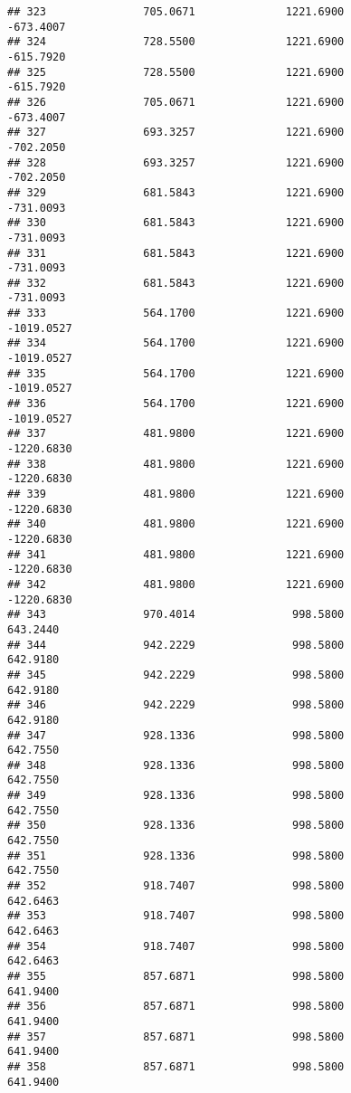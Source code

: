\documentclass[]{article}
\begin{document}
\begin{verbatim}
## 323               705.0671              1221.6900           -673.4007
## 324               728.5500              1221.6900           -615.7920
## 325               728.5500              1221.6900           -615.7920
## 326               705.0671              1221.6900           -673.4007
## 327               693.3257              1221.6900           -702.2050
## 328               693.3257              1221.6900           -702.2050
## 329               681.5843              1221.6900           -731.0093
## 330               681.5843              1221.6900           -731.0093
## 331               681.5843              1221.6900           -731.0093
## 332               681.5843              1221.6900           -731.0093
## 333               564.1700              1221.6900          -1019.0527
## 334               564.1700              1221.6900          -1019.0527
## 335               564.1700              1221.6900          -1019.0527
## 336               564.1700              1221.6900          -1019.0527
## 337               481.9800              1221.6900          -1220.6830
## 338               481.9800              1221.6900          -1220.6830
## 339               481.9800              1221.6900          -1220.6830
## 340               481.9800              1221.6900          -1220.6830
## 341               481.9800              1221.6900          -1220.6830
## 342               481.9800              1221.6900          -1220.6830
## 343               970.4014               998.5800            643.2440
## 344               942.2229               998.5800            642.9180
## 345               942.2229               998.5800            642.9180
## 346               942.2229               998.5800            642.9180
## 347               928.1336               998.5800            642.7550
## 348               928.1336               998.5800            642.7550
## 349               928.1336               998.5800            642.7550
## 350               928.1336               998.5800            642.7550
## 351               928.1336               998.5800            642.7550
## 352               918.7407               998.5800            642.6463
## 353               918.7407               998.5800            642.6463
## 354               918.7407               998.5800            642.6463
## 355               857.6871               998.5800            641.9400
## 356               857.6871               998.5800            641.9400
## 357               857.6871               998.5800            641.9400
## 358               857.6871               998.5800            641.9400

\end{verbatim}
\end{document}
